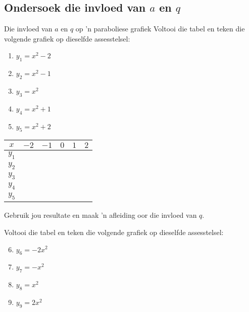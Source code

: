 \clearpage
\subsection*{Ondersoek die invloed van $a$ en $q$ }
\begin{Investigation}{Die invloed van $a$ en $q$ op 'n paraboliese grafiek}
Voltooi die tabel en teken die volgende grafiek op dieselfde assesstelsel:
    \begin{enumerate}[noitemsep, label=\textbf{\arabic*}. ] 
    \item $y_1={x}^{2}-2$
    \item $y_2={x}^{2}-1$
    \item $y_3={x}^{2}$
    \item $y_4={x}^{2}+1$
    \item $y_5={x}^{2}+2$
    \end{enumerate}

\begin{table}[H]
  \begin{center}
    \begin{tabular}{|c|c|c|c|c|c|}\hline
      $x$ & $-2$ & $-1$ & $0$ & $1$ & $2$ \\ \hline
      $y_1$ & \hspace{1cm}  & \hspace{1cm}  & \hspace{1cm}  & \hspace{1cm}  & \hspace{1cm}  \\ \hline
      $y_2$ & & & & & \\ \hline
      $y_3$ & & & & & \\ \hline
      $y_4$ & & & & & \\ \hline
      $y_5$ & & & & & \\ \hline
    \end{tabular}
  \end{center}
\end{table}
Gebruik jou resultate en maak 'n afleiding oor die invloed van $q$.\\
\par
Voltooi die tabel en teken die volgende grafiek op dieselfde assesstelsel:
\begin{enumerate}[noitemsep, label=\textbf{\arabic*}. ] 
\setcounter{enumi}{5}
\item $y_6=-2{x}^{2}$
\item $y_7=-{x}^{2}$
\item $y_8={x}^{2}$
\item $y_9=2{x}^{2}$
\end{enumerate}


\end{Investigation}
